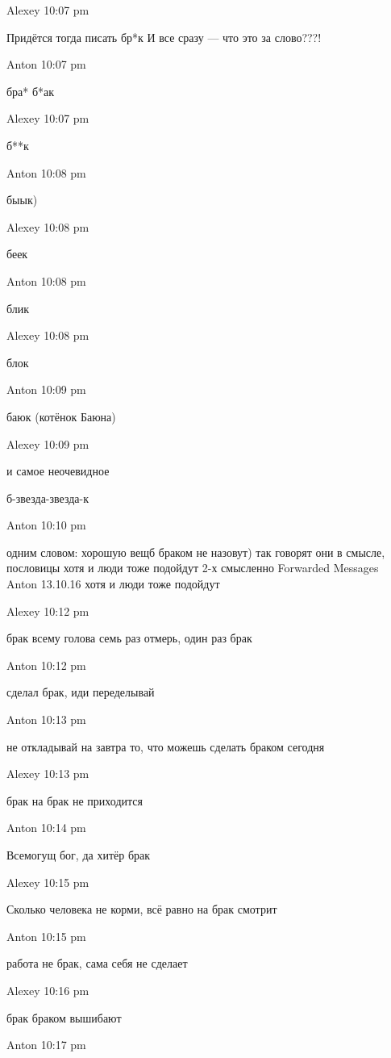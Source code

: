 Alexey 10:07 pm

    Придётся тогда писать бр*к
    И все сразу — что это за слово???!

Anton 10:07 pm

    бра*
    б*ак

Alexey 10:07 pm

    б**к

Anton 10:08 pm

    быык)

Alexey 10:08 pm

    беек

Anton 10:08 pm

    блик

Alexey 10:08 pm

    блок

Anton 10:09 pm

    баюк
    (котёнок Баюна)

Alexey 10:09 pm

    и самое неочевидное

    б-звезда-звезда-к

Anton 10:10 pm

    одним словом: хорошую вещб браком не назовут)
    так говорят они
    в смысле, пословицы
    хотя и люди тоже подойдут
    2-х смысленно
    Forwarded Messages
    Anton 13.10.16
        хотя и люди тоже подойдут

Alexey 10:12 pm

    брак всему голова
    семь раз отмерь, один раз брак

Anton 10:12 pm

    сделал брак, иди переделывай

Anton 10:13 pm

    не откладывай на завтра то, что можешь сделать браком сегодня

Alexey 10:13 pm

    брак на брак не приходится

Anton 10:14 pm

    Всемогущ бог, да хитёр брак

Alexey 10:15 pm

    Сколько человека не корми, всё равно на брак смотрит

Anton 10:15 pm

    работа не брак, сама себя не сделает

Alexey 10:16 pm

    брак браком вышибают

Anton 10:17 pm

